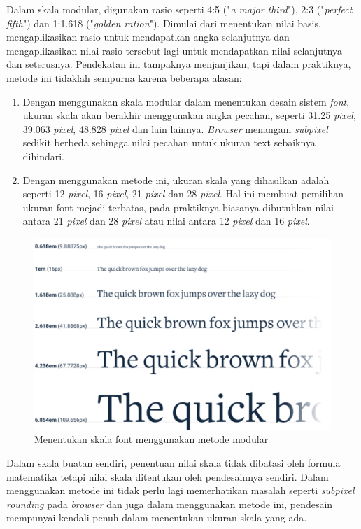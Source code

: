Dalam skala modular, digunakan rasio seperti 4:5 ("\emph{a major third}"), 2:3 ("\emph{perfect fifth}") dan 1:1.618 ("\emph{golden ration}"). Dimulai dari menentukan nilai basis, mengaplikasikan rasio untuk mendapatkan angka selanjutnya dan mengaplikasikan nilai rasio tersebut lagi untuk mendapatkan nilai selanjutnya dan seterusnya. Pendekatan ini tampaknya menjanjikan, tapi dalam praktiknya, metode ini tidaklah sempurna karena beberapa alasan:

\begin{enumerate}
	\item{Dengan menggunakan skala modular dalam menentukan desain sistem \textit{font}, ukuran skala akan berakhir menggunakan angka pecahan, seperti  31.25 \textit{pixel}, 39.063 \textit{pixel}, 48.828 \textit{pixel} dan lain lainnya. \textit{Browser} menangani \textit{subpixel} sedikit berbeda sehingga nilai pecahan untuk ukuran text sebaiknya dihindari}.
	\item {Dengan menggunakan metode ini, ukuran skala yang dihasilkan adalah seperti 12 \textit{pixel}, 16 \textit{pixel}, 21 \textit{pixel} dan 28 \textit{pixel}. Hal ini membuat pemilihan ukuran font mejadi terbatas, pada praktiknya biasanya dibutuhkan nilai antara 21 \textit{pixel} dan 28 \textit{pixel} atau nilai antara 12 \textit{pixel} dan 16 \textit{pixel}}.
\end{enumerate}

\begin{figure}[H]
	\centering
	\includegraphics[keepaspectratio, width=12cm]{gambar/refactoring-ui-g6.png}
	\caption{Menentukan skala font menggunakan metode modular \citep{refactoringui}}
	\label{gambar:refactoring-ui-g6.png}
\end{figure}

Dalam skala buatan sendiri, penentuan nilai skala tidak dibatasi oleh formula matematika tetapi nilai skala ditentukan oleh pendesainnya sendiri. Dalam menggunakan metode ini tidak perlu lagi memerhatikan masalah seperti \textit{subpixel rounding} pada \textit{browser} dan juga dalam menggunakan metode ini, pendesain mempunyai kendali penuh dalam menentukan ukuran skala yang ada.

